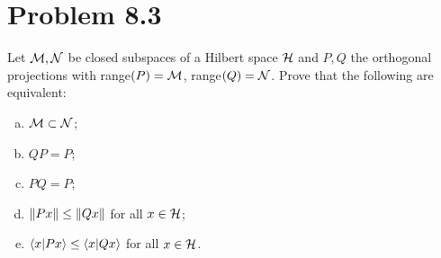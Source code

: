 \section{Problem 8.3}
Let $\mathcal{M}, \mathcal{N}$ be closed subspaces of a Hilbert space $\mathcal{H}$ and $P, Q$ the orthogonal projections with range$(P) = \mathcal{M}$, range$(Q) = \mathcal{N}$. Prove that the following are equivalent:
\begin{enumerate}[a)]
    \item $\mathcal{M} \subset \mathcal{N}$;
    \item $QP = P$;
    \item $PQ = P$;
    \item $\norm{Px} \leq \norm{Qx}$ for all $x \in \mathcal{H}$;
    \item $\braket{x}{Px} \leq \braket{x}{Qx}$ for all $x \in \mathcal{H}$.
\end{enumerate}
\partbreak
